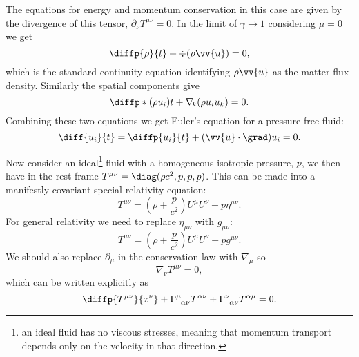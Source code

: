 \documentclass[fleqn]{NotesClass}
\newcommand*{\christoffel}[3]{\tensor{\Gamma}{^{#1}_{{#2}{#3}}}}
\newcommand*{\covariantDerivative}[1]{\nabla_{\!#1}}
\begin{document}
    The equations for energy and momentum conservation in this case are given by the divergence of this tensor, \(\partial_\nu T^{\mu\nu} = 0\).
    In the limit of \(\gamma \to 1\) considering \(\mu = 0\) we get
    \begin{equation}
        \diffp{\rho}{t} + \div(\rho\vv{u}) = 0,
    \end{equation}
    which is the standard continuity equation identifying \(\rho\vv{u}\) as the matter flux density.
    Similarly the spatial components give
    \begin{equation}
        \diffp*{(\rho u_i)}{t} + \covariantDerivative{k}(\rho u_i u_k) = 0.
    \end{equation}
    Combining these two equations we get Euler's equation for a pressure free fluid:
    \begin{equation}
        \diff{u_i}{t} = \diffp{u_i}{t} + (\vv{u} \cdot \grad)u_i = 0.
    \end{equation}
    
    Now consider an ideal\footnote{an ideal fluid has no viscous stresses, meaning that momentum transport depends only on the velocity in that direction.} fluid with a homogeneous isotropic pressure, \(p\), we then have in the rest frame \(T^{\mu\nu} = \diag(\rho c^2, p, p, p)\).
    This can be made into a manifestly covariant special relativity equation:
    \begin{equation}
        T^{\mu\nu} = \left( \rho + \frac{p}{c^2} \right)U^\mu U^\nu - p \eta^{\mu\nu}.
    \end{equation}
    For general relativity we need to replace \(\eta_{\mu\nu}\) with \(g_{\mu\nu}\):
    \begin{equation}
        T^{\mu\nu} = \left( \rho + \frac{p}{c^2} \right)U^\mu U^\nu - pg^{\mu\nu}.
    \end{equation}
    We should also replace \(\partial_\mu\) in the conservation law with \(\covariantDerivative{\mu}\) so
    \begin{equation}
        \covariantDerivative{\nu} T^{\mu\nu} = 0,
    \end{equation}
    which can be written explicitly as
    \begin{equation}
        \diffp{T^{\mu\nu}}{x^\nu} + \christoffel{\mu}{\alpha}{\nu} T^{\alpha\nu} + \christoffel{\nu}{\alpha}{\nu}T^{\alpha\mu} = 0.
    \end{equation}
    
\end{document}
